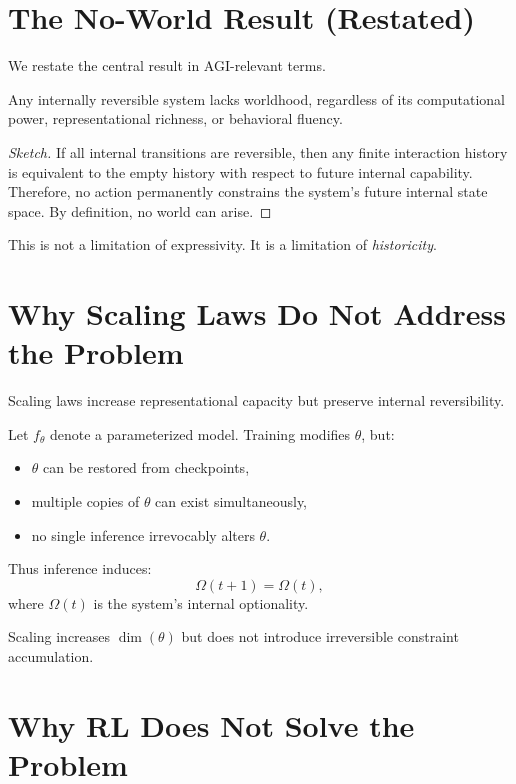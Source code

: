 \documentclass[11pt]{book}
\begin{document}
\section{The No-World Result (Restated)}

We restate the central result in AGI-relevant terms.

\begin{theorem}
Any internally reversible system lacks worldhood, regardless of its
computational power, representational richness, or behavioral fluency.
\end{theorem}

\begin{proof}[Sketch]
If all internal transitions are reversible, then any finite interaction
history is equivalent to the empty history with respect to future internal
capability. Therefore, no action permanently constrains the system’s
future internal state space. By definition, no world can arise.
\end{proof}

This is not a limitation of expressivity. It is a limitation of
\emph{historicity}.

\section{Why Scaling Laws Do Not Address the Problem}

Scaling laws increase representational capacity but preserve internal
reversibility.

Let $f_\theta$ denote a parameterized model. Training modifies $\theta$,
but:
\begin{itemize}
\item $\theta$ can be restored from checkpoints,
\item multiple copies of $\theta$ can exist simultaneously,
\item no single inference irrevocably alters $\theta$.
\end{itemize}

Thus inference induces:
\[
\Omega(t+1) = \Omega(t),
\]
where $\Omega(t)$ is the system’s internal optionality.

Scaling increases $\dim(\theta)$ but does not introduce irreversible
constraint accumulation.

\section{Why RL Does Not Solve the Problem}
\end{document}

